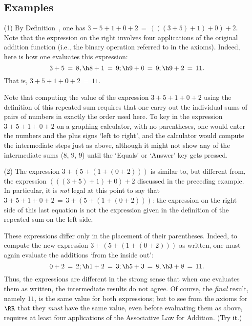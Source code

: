 {\V
\V

            \subsection{\small{\bf Examples}}
            \label{ExampB10.32}

\V

\hspace*{\parindent}(1) By Definition~, one has $3 + 5 + 1 + 0 + 2 \,=\, (((3+5)+1)+0)+2$.
    Note that the expression on the right involves four applications of the original addition function
    (i.e., the binary operation referred to in the axioms). Indeed, here is how one evaluates this expression:
        \begin{displaymath}
        3+5 \,=\, 8, \h 8+1 \,=\, 9; \h 9+0 \,=\, 9; \h 9+2 \,=\, 11.
        \end{displaymath}
    That is, $3 + 5 + 1 + 0 + 2 \,=\,11$.

    Note that computing the value of the expression $3 + 5 + 1 + 0 + 2$ using the definition of this repeated sum requires that one carry out the individual sums of pairs of numbers in exactly the order used here.
    To key in the expression $3 + 5 + 1 + 0 + 2$ on a graphing calculator, with no parentheses,
    one would enter the numbers and the plus signs `left to right', and the calculator would compute the intermediate steps just as above,
    although it might not show any of the intermediate sums ($8$, $9$, $9$) until the `Equals' or `Answer' key gets pressed.

\V

        (2) The expression $3+(5+(1+(0+2)))$ is similar to, but different from, the expression $(((3+5)+1)+0)+2$ discussed in the preceding example.
    In particular, it is {\em not} legal at this point to say that $3 + 5 + 1 + 0 + 2 \,=\, 3+(5+(1+(0+2)))$:
    the expression on the right side of this last equation is not the expression given in the definition of the repeated sum on the left side.

        These expressions differ only in the placement of their parentheses.
    Indeed, to compute the new expression $3+(5+(1+(0+2)))$ as written, one must again evaluate the additions `from the inside out':
        \begin{displaymath}
        0+2 \,=\, 2; \h 1+2 \,=\, 3; \h 5+3 \,=\, 8; \h 3+8 \,=\, 11.
        \end{displaymath}
    Thus, the expressions are different in the strong sense that when one evaluates them as written, the intermediate results do not agree.
    Of course, the {\em final} result, namely $11$, is the same value for both expressions;
    but to see from the axioms for ${\RR}$ that they {\em must} have the same value, even before evaluating them as above,
    requires at least four applications of the Associative Law for Addition. (Try it.)

}
